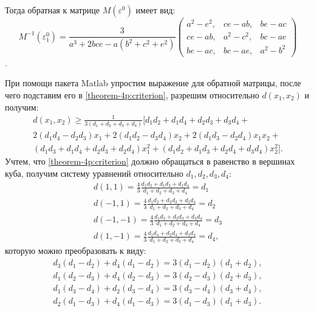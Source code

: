 	Тогда обратная к матрице $M(\varepsilon^0)$ имеет вид:
	\begin{equation} \label{theorem-4p:inv-matrix}
		M^{-1}(\varepsilon_1^0) = \frac 3 {a^3 + 2 b c e - a(b^2 + c^2 + e^2)}
		\begin{pmatrix}
			a^2 - e^2,& ce - ab, & be - ac\\
			ce - ab,& a^2-c^2,& bc-ae\\
			be - ac,& bc - ae,& a^2 - b^2			
		\end{pmatrix} 
	\end{equation}.	
	
	При помощи пакета Matlab упростим выражение для обратной матрицы, после чего подставим его в \eqref{theorem-4p:criterion}, разрешим относительно $d(x_1, x_2)$ и получим:
	\begin{gather*}
		d(x_1, x_2) \ge \frac 1 {3 (d_1 + d_2 + d_3 + d_4)} 
		[ 
			d_1 d_2 + d_1 d_4 + d_2 d_3 + d_3 d_4 +  \\
			2 (d_1 d_4 - d_2 d_3)x_1 + 2 (d_1 d_2 - d_3 d_4) x_2 +
			2 (d_1 d_3 - d_2 d_4)x_1 x_2 + \\
			(d_1 d_3 + d_1 d_4 + d_2 d_3 + d_2 d_4)x_1^2 + 
			(d_1 d_2 + d_1 d_3 + d_2 d_4 + d_3 d_4)x_2^2
		].
	\end{gather*}
	Учтем, что \eqref{theorem-4p:criterion} должно обращаться в равенство в вершинах куба, получим систему уравнений относительно $d_1, d_2, d_3, d_4$:
	\begin{gather*}
		d(1, 1) = \frac 4 3 \frac {d_1 d_2 + d_1 d_3 + d_1 d_4} {d_1 + d_2 + d_3 + d_4} = d_1 \\
		d(-1, 1) = \frac 4 3 \frac {d_1 d_2 + d_2 d_3 + d_2 d_4} {d_1 + d_2 + d_3 + d_4} = d_2 \\
		d(-1, -1) = \frac 4 3 \frac {d_1 d_3 + d_2 d_3 + d_3 d_4} {d_1 + d_2 + d_3 + d_4} = d_3 \\
		d(1, -1) = \frac 4 3 \frac {d_1 d_4 + d_2 d_4 + d_3 d_4} {d_1 + d_2 + d_3 + d_4} = d_4,
	\end{gather*}
	которую можно преобразовать к виду:
	\begin{gather*}
		d_3 (d_1 - d_2) + d_4 (d_1 - d_2) = 3 (d_1 - d_2) (d_1 + d_2), \\
		d_1 (d_2 - d_3) + d_4 (d_2 - d_3) = 3 (d_2 - d_3) (d_2 + d_3), \\
		d_1 (d_3 - d_4) + d_2 (d_3 - d_4) = 3 (d_3 - d_4) (d_3 + d_4), \\
		d_2 (d_1 - d_3) + d_4 (d_1 - d_3) = 3 (d_1 - d_3) (d_1 + d_3). \\
	\end{gather*}
